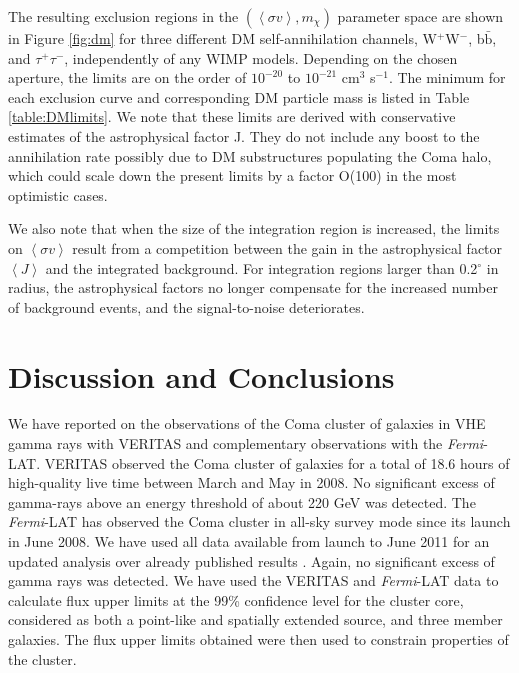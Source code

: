 \documentclass[12pt,manuscript]{aastex}
\newcommand{\expval}[1]{\left\langle #1 \right\rangle}
\begin{document}
The resulting exclusion regions in the $(\expval{\sigma v}, m_{\chi})$ parameter space are shown in
Figure \ref{fig:dm} for three different DM self-annihilation channels, W$^{+}$W$^{-}$,
b$\bar{\mathrm{b}}$, and $\tau^{+}\tau^{-}$, independently of any WIMP models. Depending on the
chosen aperture, the limits are on the order of $10^{-20}$ to $10^{-21}$ cm$^{3}$ s$^{-1}$. The
minimum for each exclusion curve and corresponding DM particle mass is listed in Table
\ref{table:DMlimits}. We note that these limits are derived with conservative estimates of the
astrophysical factor J. They do not include any boost to the annihilation rate possibly due to DM
substructures populating the Coma halo, which could scale down the present limits by a factor
O(100) in the most optimistic cases.

We also note that when the size of the integration region is increased, the limits on
$\expval{\sigma v}$ result from a competition between the gain in the astrophysical factor
$\expval{J}$ and the integrated background. For integration regions larger than 0.2$^{\circ}$ in
radius, the astrophysical factors no longer compensate for the increased number of background
events, and the signal-to-noise deteriorates.

%
%

\section{Discussion and Conclusions}
We have reported on the observations of the Coma cluster of galaxies in VHE gamma rays with VERITAS
and complementary observations with the \emph{Fermi}-LAT. VERITAS observed the Coma cluster of
galaxies for a total of 18.6 hours of high-quality live time between March and May in 2008. No
significant excess of gamma-rays above an energy threshold of about 220 GeV was detected. The
\emph{Fermi}-LAT has observed the Coma cluster in all-sky survey mode since its launch in June
2008. We have used all data available from launch to June 2011 for an updated analysis over already
published results \citep{article:Ackermann_etal:2010}. Again, no significant excess of gamma rays
was detected. We have used the VERITAS and \emph{Fermi}-LAT data to calculate flux upper limits at
the 99\% confidence level for the cluster core, considered as both a point-like and spatially
extended source, and three member galaxies. The flux upper limits obtained were then used to
constrain properties of the cluster.
\end{document}
